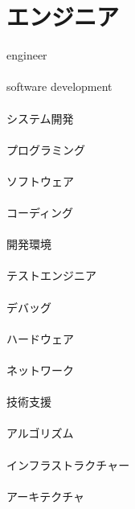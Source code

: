 \clearpage
\section*{エンジニア}
engineer
\\\\
software development
\\\\
システム開発
\\\\
プログラミング
\\\\
ソフトウェア
\\\\
コーディング
\\\\
開発環境
\\\\
テストエンジニア
\\\\
デバッグ
\\\\
ハードウェア
\\\\
ネットワーク
\\\\
技術支援
\\\\
アルゴリズム
\\\\
インフラストラクチャー
\\\\
アーキテクチャ
